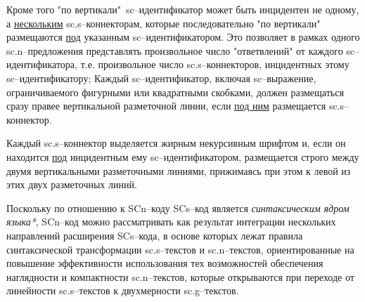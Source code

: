 Кроме того "по вертикали"\ sc--идентификатор может быть инцидентен не одному, а \uline{нескольким} sc.s--коннекторам, которые последовательно "по вертикали"{} размещаются \uline{под} указанным sc--идентификатором. Это позволяет в рамках одного sc.n--предложения представлять произвольное число "ответвлений"{} от каждого sc--идентификатора, т.е. произвольное число sc.s--коннекторов, инцидентных этому sc--идентификатору;
Каждый sc--идентификатор, включая sc--выражение, ограничиваемого фигурными или квадратными скобками, должен размещаться сразу правее вертикальной разметочной линии, если \uline{под ним} размещается sc.s--коннектор.

Каждый sc.s--коннектор выделяется жирным некурсивным шрифтом и, если он находится \uline{под} инцидентным ему sc--идентификатором, размещается строго между двумя вертикальными разметочными линиями, прижимаясь при этом к левой из этих двух разметочных линий.

Поскольку по отношению к SCn--коду SCs--код является \textit{синтаксическим ядром языка*}, SCn--код можно рассматривать как результат интеграции нескольких направлений расширения SCs--кода, в основе которых лежат правила синтаксической трансформации sc.s--текстов и sc.n--текстов, ориентированные на повышение эффективности использования тех возможностей обеспечения наглядности и компактности sc.n--текстов, которые открываются при переходе от линейности sc.s--текстов к двухмерности sc.g--текстов.

%